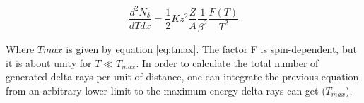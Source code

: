 \begin{equation}
    \frac{d^2N_{\delta}}{dTdx} = \frac{1}{2}Kz^2\frac{Z}{A}\frac{1}{\beta^2}\frac{F(T)}{T^2}
    \label{eq:deltaN}
\end{equation}

Where $Tmax$ is given by equation \ref{eq:tmax}. The factor F is spin-dependent, but it is about unity for $ T \ll  T_{max}$. In order to calculate the total number of generated delta rays per unit of distance, one can integrate the previous equation from an arbitrary lower limit to the maximum energy delta rays can get ($T_{max}$). 

